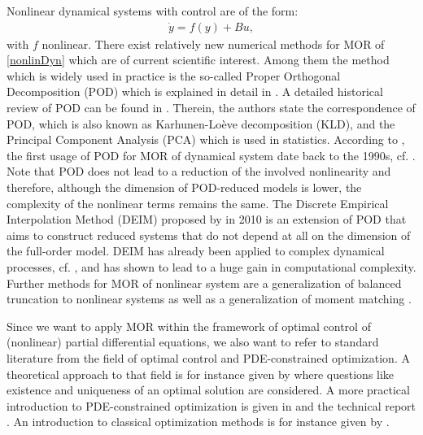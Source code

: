 Nonlinear dynamical systems with control are of the form:
\begin{align}
\label{nonlinDyn}
\dot{y} = f(y) + Bu,
\end{align}
with $f$ nonlinear. There exist relatively new numerical methods for MOR of \eqref{nonlinDyn} which are of current scientific interest. Among them the method which is widely used in practice is the so-called Proper Orthogonal Decomposition (POD) which is explained in detail in \cite{A00_diss,V11}. A detailed historical review of POD can be found in \cite{KGVB05}. Therein, the authors state the correspondence of POD, which is also known as Karhunen-Lo\`{e}ve decomposition (KLD), and the Principal Component Analysis (PCA) \cite{PCA} which is used in statistics. According to \cite{KGVB05}, the first usage of POD for MOR of dynamical system date back to the 1990s, cf. \cite{PODold}. Note that POD does not lead to a reduction of the involved nonlinearity and therefore, although the dimension of POD-reduced models is lower, the complexity of the nonlinear terms remains the same. The Discrete Empirical Interpolation Method (DEIM) proposed by \cite{Cha11,DEIM} in 2010 is an extension of POD that aims to construct reduced systems that do not depend at all on the dimension of the full-order model. DEIM has already been applied to complex dynamical processes, cf. \cite{CS10}, and has shown to lead to a huge gain in computational complexity. Further methods for MOR of nonlinear system are a generalization of balanced truncation to nonlinear systems \cite{L02} as well as a generalization of moment matching \cite{BS,CW}.

Since we want to apply MOR within the framework of optimal control of (nonlinear) partial differential equations, we also want to refer to standard literature from the field of optimal control and PDE-constrained optimization. A theoretical approach to that field is for instance given by \cite{L12,T10} where questions like existence and uniqueness of an optimal solution are considered. A more practical introduction to PDE-constrained optimization is given in \cite {B75,H10,L71} and the technical report \cite{H08}. An introduction to classical optimization methods is for instance given by \cite{NW06,Rao09}.
